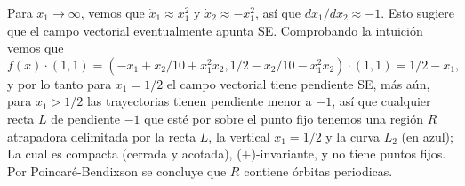 \documentclass[10pt]{article}
\begin{document}
Para \(x_1 \to \infty\), vemos que \(\dot x_1 \approx x_1^2\) y \(\dot x_2
\approx -x_1^2\), así que \(dx_1/dx_2 \approx -1\). Esto sugiere que el campo
vectorial eventualmente apunta SE. Comprobando la intuición vemos que
\[
	f(x)\cdot (1,1)
	=
	(-x_1 + x_2/10 + x_1^2 x_2, 1/2 - x_2/10 - x_1^2 x_2)\cdot(1,1)
	=
	1/2 - x_1
,\]
y por lo tanto para \(x_1 = 1/2\) el campo vectorial tiene pendiente SE, más
aún, para \(x_1 > 1/2\) las trayectorias tienen pendiente menor a \(-1\), así
que cualquier recta \(L\) de pendiente \(-1\) que esté por sobre el punto fijo tenemos
una región \(R\) atrapadora delimitada por la recta \(L\), la vertical \(x_1 =
1/2\) y la curva \(L_2\) (en azul); La cual es compacta (cerrada y acotada),
(\(+\))-invariante, y no tiene puntos fijos. Por Poincaré-Bendixson se concluye que
\(R\) contiene órbitas periodicas.
\end{document}
